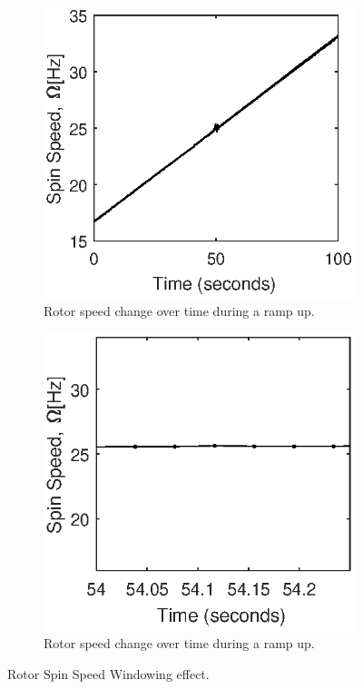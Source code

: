 \begin{figure}
	\begin{subfigure}{.5\textwidth}
	\centering
	\includegraphics[]{./figures/FrequencySpan.eps}
	\caption{Rotor speed change over time during a ramp up.}
	\label{fig:FreqSpanOverTime}
\end{subfigure}
\begin{subfigure}{.5\textwidth}
	\centering
	\includegraphics{./figures/FrequencyWindow.eps}
	\caption{Rotor speed change over time during a ramp up.}
	\label{fig:FreqSpanWindow}
\end{subfigure}
\caption{Rotor Spin Speed Windowing effect.}
\label{fig:SpeedWindow}
\end{figure}
